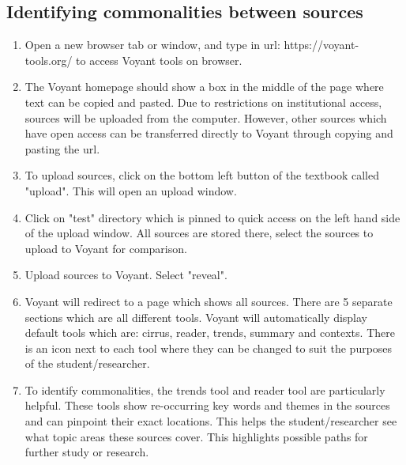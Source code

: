 \documentclass{article}
\begin{document}
\subsection{Identifying commonalities between sources}
\begin{enumerate}
    \item Open a new browser tab or window, and type in url: https://voyant-tools.org/ to access Voyant tools on browser.
    \item The Voyant homepage should show a box in the middle of the page where text can be copied and pasted. Due to restrictions on institutional access, sources will be uploaded from the computer. However, other sources which have open access can be transferred directly to Voyant through copying and pasting the url.
    \item To upload sources, click on the bottom left button of the textbook called "upload". This will open an upload window.
    \item Click on "test" directory which is pinned to quick access on the left hand side of the upload window. All sources are stored there, select the sources to upload to Voyant for comparison.
    \item Upload sources to Voyant. Select "reveal".
    \item Voyant will redirect to a page which shows all sources. There are 5 separate sections which are all different tools. Voyant will automatically display default tools which are: cirrus, reader, trends, summary and contexts. There is an icon next to each tool where they can be changed to suit the purposes of the student/researcher.
    \item To identify commonalities, the trends tool and reader tool are particularly helpful. These tools show re-occurring key words and themes in the sources and can pinpoint their exact locations. This helps the student/researcher see what topic areas these sources cover. This highlights possible paths for further study or research. 

\end{enumerate}
\end{document}
